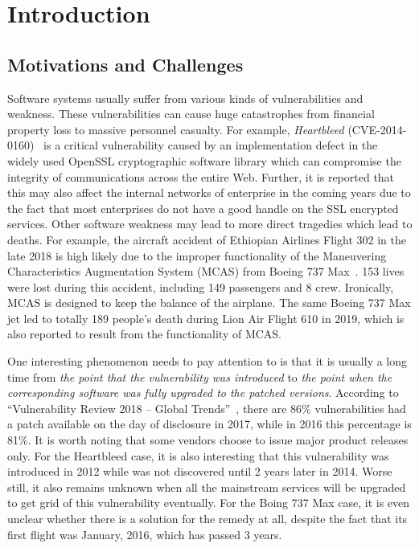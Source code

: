 
\chapter{Introduction} \label{ch:introduction}


\section{Motivations and Challenges}
Software systems usually suffer from various kinds of vulnerabilities and weakness. These vulnerabilities can cause huge catastrophes from financial property loss to massive personnel casualty. For example, \emph{Heartbleed} (CVE-2014-0160)~\cite{heartbleed} is a critical vulnerability caused by an implementation defect in the widely used OpenSSL cryptographic software library which can compromise the integrity of communications across the entire Web. Further, it is reported that this may also affect the internal networks of enterprise in the coming years due to the fact that most enterprises do not have a good handle on the SSL encrypted services. Other software weakness may lead to more direct tragedies which lead to deaths. For example, the aircraft accident of Ethiopian Airlines Flight 302 in the late 2018 is high likely due to the improper functionality of the Maneuvering Characteristics Augmentation System (MCAS) from Boeing 737 Max~\cite{boeing_Ethiopian}. 153 lives were lost during this accident, including 149 passengers and 8 crew. Ironically, MCAS is designed to keep the balance of the airplane. The same Boeing 737 Max jet led to totally 189 people's death during Lion Air Flight 610 in 2019, which is also reported to result from the functionality of MCAS.

One interesting phenomenon needs to pay attention to is that it is usually a long time from \emph{the point that the vulnerability was introduced} to \emph{the point when the corresponding software was fully upgraded to the patched versions}. According to ``Vulnerability Review 2018 -- Global Trends''~\cite{vul_flexera18}, there are 86\% vulnerabilities had a patch available on the day of disclosure in 2017, while in 2016 this percentage is 81\%. It is worth noting that some vendors choose to issue major product releases only. For the Heartbleed case, it is also interesting that this vulnerability was introduced in 2012 while was not discovered until 2 years later in 2014. Worse still, it also remains unknown when all the mainstream services will be upgraded to get grid of this vulnerability eventually. For the Boing 737 Max case, it is even unclear whether there is a solution for the remedy at all, despite the fact that its first flight was January, 2016, which has passed 3 years.

